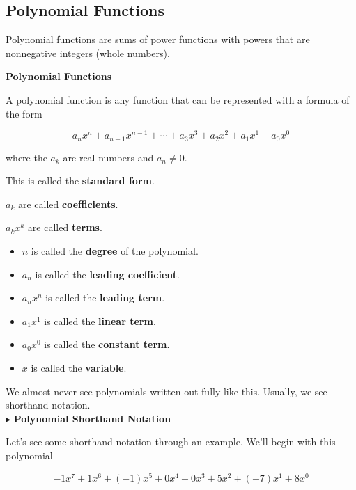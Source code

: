 \documentclass{ximera}
\begin{document}
\subsection{Polynomial Functions}


Polynomial functions are sums of power functions with powers that are nonnegative integers (whole numbers).


\begin{definition} \textbf{\textcolor{green!50!black}{Polynomial Functions}} 

A polynomial function is any function that can be represented with a formula of the form

\[    a_n x^n + a_{n-1} x^{n-1} + \cdots + a_3 x^3 + a_2 x^2 + a_1 x^1 + a_0 x^0      \]

where the $a_k$ are real numbers and $a_n \ne 0$.

This is called the \textbf{standard form}.

$a_k$ are called \textbf{coefficients}.

$a_k x^k$ are called \textbf{terms}.



\begin{itemize}
\item $n$ is called the \textbf{degree} of the polynomial.
\item $a_n$ is called the \textbf{leading coefficient}.
\item $a_n x^n$ is called the \textbf{leading term}.
\item $a_1 x^1$ is called the \textbf{linear term}.
\item $a_0 x^0$ is called the \textbf{constant term}.
\item $x$ is called the \textbf{variable}.
\end{itemize}


\end{definition}




We almost never see polynomials written out fully like this.  Usually, we see shorthand notation.   \\



$\blacktriangleright$ \textbf{\textcolor{blue!55!black}{Polynomial Shorthand Notation}}



Let's see some shorthand notation through an example.  We'll begin with this polynomial


\[  -1 x^7 + 1 x^6 + (-1) x^5 + 0 x^4 + 0 x^3 + 5 x^2 + (-7) x^1 + 8 x^0              \]
\end{document}
